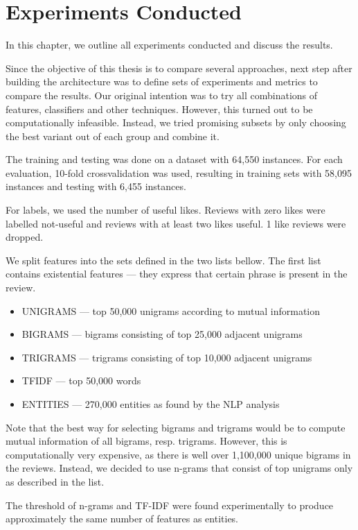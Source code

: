 \chapter{Experiments Conducted}\label{chap:exp}

In this chapter, we outline all experiments conducted and discuss the results.

Since the objective of this thesis is to compare several approaches,
next step after building the architecture was to define sets of experiments and metrics to compare the results.
Our original intention was to try all combinations of features, classifiers and other techniques.
However, this turned out to be computationally infeasible.
Instead, we tried promising subsets by only choosing the best variant out of each group and combine it.

The training and testing was done on a dataset with 64,550 instances.
For each evaluation, 10-fold crossvalidation was used, resulting in
training sets with 58,095 instances and testing with 6,455 instances.

For labels, we used the number of useful likes.
Reviews with zero likes were labelled not-useful and
reviews with at least two likes useful.
1 like reviews were dropped.

We split features into the sets defined in the two lists bellow.
The first list contains existential features --- they express that certain phrase is present in the review.

\begin{itemize}
	\item UNIGRAMS --- top 50,000 unigrams according to mutual information
	\item BIGRAMS --- bigrams consisting of top 25,000 adjacent unigrams
	\item TRIGRAMS  --- trigrams consisting of top 10,000 adjacent unigrams
	\item TFIDF  --- top 50,000 words
	\item ENTITIES --- 270,000 entities as found by the NLP analysis
\end{itemize}

Note that the best way for selecting bigrams and trigrams would be to compute mutual information of all bigrams, resp. trigrams.
However, this is computationally very expensive, as there is well over 1,100,000 unique bigrams in the reviews.
Instead, we decided to use n-grams that consist of top unigrams only as described in the list.

The threshold of n-grams and TF-IDF were found experimentally to produce approximately the same number of features as entities.

